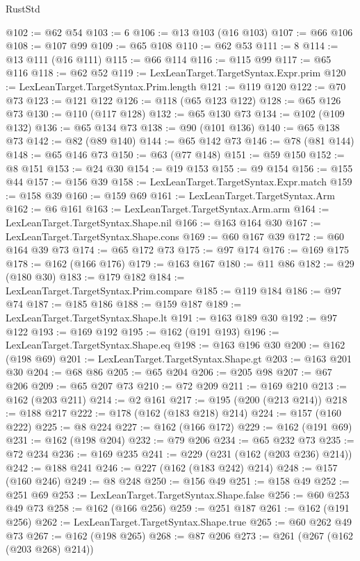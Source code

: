 \begin{lexlean}{RustStd}
\begin{coremodule}
@102 := @62 @54
@103 := 6
@106 := @13 @103 (@16 @103)
@107 := @66 @106
@108 := @107 @99
@109 := @65 @108
@110 := @62 @53
@111 := 8
@114 := @13 @111 (@16 @111)
@115 := @66 @114
@116 := @115 @99
@117 := @65 @116
@118 := @62 @52
@119 := LexLeanTarget.TargetSyntax.Expr.prim
@120 := LexLeanTarget.TargetSyntax.Prim.length
@121 := @119 @120
@122 := @70 @73
@123 := @121 @122
@126 := @118 (@65 @123 @122)
@128 := @65 @126 @73
@130 := @110 (@117 @128)
@132 := @65 @130 @73
@134 := @102 (@109 @132)
@136 := @65 @134 @73
@138 := @90 (@101 @136)
@140 := @65 @138 @73
@142 := @82 (@89 @140)
@144 := @65 @142 @73
@146 := @78 (@81 @144)
@148 := @65 @146 @73
@150 := @63 (@77 @148)
@151 := @59 @150
@152 := @8 @151
@153 := @24 @30
@154 := @19 @153
@155 := @9 @154
@156 := @155 @44
@157 := @156 @39
@158 := LexLeanTarget.TargetSyntax.Expr.match
@159 := @158 @39
@160 := @159 @69
@161 := LexLeanTarget.TargetSyntax.Arm
@162 := @6 @161
@163 := LexLeanTarget.TargetSyntax.Arm.arm
@164 := LexLeanTarget.TargetSyntax.Shape.nil
@166 := @163 @164 @30
@167 := LexLeanTarget.TargetSyntax.Shape.cons
@169 := @60 @167 @39
@172 := @60 @164 @39 @73
@174 := @65 @172 @73
@175 := @97 @174
@176 := @169 @175
@178 := @162 (@166 @176)
@179 := @163 @167
@180 := @11 @86
@182 := @29 (@180 @30)
@183 := @179 @182
@184 := LexLeanTarget.TargetSyntax.Prim.compare
@185 := @119 @184
@186 := @97 @74
@187 := @185 @186
@188 := @159 @187
@189 := LexLeanTarget.TargetSyntax.Shape.lt
@191 := @163 @189 @30
@192 := @97 @122
@193 := @169 @192
@195 := @162 (@191 @193)
@196 := LexLeanTarget.TargetSyntax.Shape.eq
@198 := @163 @196 @30
@200 := @162 (@198 @69)
@201 := LexLeanTarget.TargetSyntax.Shape.gt
@203 := @163 @201 @30
@204 := @68 @86
@205 := @65 @204
@206 := @205 @98
@207 := @67 @206
@209 := @65 @207 @73
@210 := @72 @209
@211 := @169 @210
@213 := @162 (@203 @211)
@214 := @2 @161
@217 := @195 (@200 (@213 @214))
@218 := @188 @217
@222 := @178 (@162 (@183 @218) @214)
@224 := @157 (@160 @222)
@225 := @8 @224
@227 := @162 (@166 @172)
@229 := @162 (@191 @69)
@231 := @162 (@198 @204)
@232 := @79 @206
@234 := @65 @232 @73
@235 := @72 @234
@236 := @169 @235
@241 := @229 (@231 (@162 (@203 @236) @214))
@242 := @188 @241
@246 := @227 (@162 (@183 @242) @214)
@248 := @157 (@160 @246)
@249 := @8 @248
@250 := @156 @49
@251 := @158 @49
@252 := @251 @69
@253 := LexLeanTarget.TargetSyntax.Shape.false
@256 := @60 @253 @49 @73
@258 := @162 (@166 @256)
@259 := @251 @187
@261 := @162 (@191 @256)
@262 := LexLeanTarget.TargetSyntax.Shape.true
@265 := @60 @262 @49 @73
@267 := @162 (@198 @265)
@268 := @87 @206
@273 := @261 (@267 (@162 (@203 @268) @214))

\end{coremodule}
\end{lexlean}
